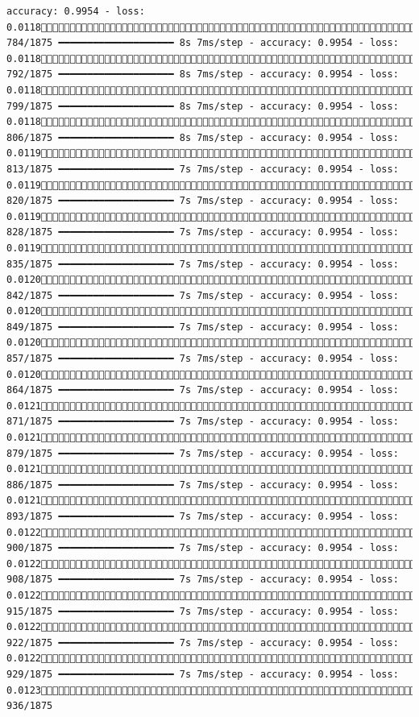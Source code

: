\documentclass[
  letterpaper,
  DIV=11,
  numbers=noendperiod]{scrreprt}
\begin{document}
\begin{verbatim}
accuracy: 0.9954 - loss: 0.0118 784/1875 ━━━━━━━━━━━━━━━━━━━━ 8s 7ms/step - accuracy: 0.9954 - loss: 0.0118 792/1875 ━━━━━━━━━━━━━━━━━━━━ 8s 7ms/step - accuracy: 0.9954 - loss: 0.0118 799/1875 ━━━━━━━━━━━━━━━━━━━━ 8s 7ms/step - accuracy: 0.9954 - loss: 0.0118 806/1875 ━━━━━━━━━━━━━━━━━━━━ 8s 7ms/step - accuracy: 0.9954 - loss: 0.0119 813/1875 ━━━━━━━━━━━━━━━━━━━━ 7s 7ms/step - accuracy: 0.9954 - loss: 0.0119 820/1875 ━━━━━━━━━━━━━━━━━━━━ 7s 7ms/step - accuracy: 0.9954 - loss: 0.0119 828/1875 ━━━━━━━━━━━━━━━━━━━━ 7s 7ms/step - accuracy: 0.9954 - loss: 0.0119 835/1875 ━━━━━━━━━━━━━━━━━━━━ 7s 7ms/step - accuracy: 0.9954 - loss: 0.0120 842/1875 ━━━━━━━━━━━━━━━━━━━━ 7s 7ms/step - accuracy: 0.9954 - loss: 0.0120 849/1875 ━━━━━━━━━━━━━━━━━━━━ 7s 7ms/step - accuracy: 0.9954 - loss: 0.0120 857/1875 ━━━━━━━━━━━━━━━━━━━━ 7s 7ms/step - accuracy: 0.9954 - loss: 0.0120 864/1875 ━━━━━━━━━━━━━━━━━━━━ 7s 7ms/step - accuracy: 0.9954 - loss: 0.0121 871/1875 ━━━━━━━━━━━━━━━━━━━━ 7s 7ms/step - accuracy: 0.9954 - loss: 0.0121 879/1875 ━━━━━━━━━━━━━━━━━━━━ 7s 7ms/step - accuracy: 0.9954 - loss: 0.0121 886/1875 ━━━━━━━━━━━━━━━━━━━━ 7s 7ms/step - accuracy: 0.9954 - loss: 0.0121 893/1875 ━━━━━━━━━━━━━━━━━━━━ 7s 7ms/step - accuracy: 0.9954 - loss: 0.0122 900/1875 ━━━━━━━━━━━━━━━━━━━━ 7s 7ms/step - accuracy: 0.9954 - loss: 0.0122 908/1875 ━━━━━━━━━━━━━━━━━━━━ 7s 7ms/step - accuracy: 0.9954 - loss: 0.0122 915/1875 ━━━━━━━━━━━━━━━━━━━━ 7s 7ms/step - accuracy: 0.9954 - loss: 0.0122 922/1875 ━━━━━━━━━━━━━━━━━━━━ 7s 7ms/step - accuracy: 0.9954 - loss: 0.0122 929/1875 ━━━━━━━━━━━━━━━━━━━━ 7s 7ms/step - accuracy: 0.9954 - loss: 0.0123 936/1875 
\end{verbatim}
\end{document}
